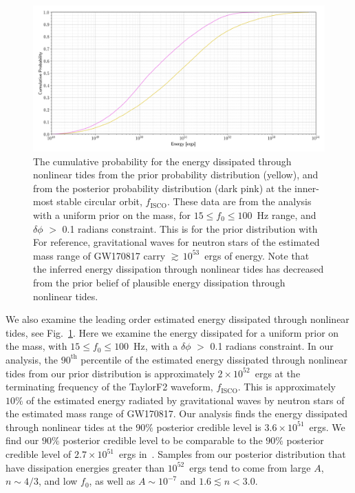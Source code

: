 \begin{figure}[th]
\includegraphics[width=\columnwidth]{figs/chapter6/uniform_narrow_f0_energy_cumulative_posterior_probability}
\caption{The cumulative probability for the energy dissipated through nonlinear tides from the prior probability distribution (yellow), and from the posterior probability distribution (dark pink) at the inner-most stable circular orbit, $f_\mathrm{ISCO}$. These data are from the analysis with a uniform prior on the mass, for $15 \leq f_0 \leq 100$~Hz range, and $\delta \phi$ $>$ 0.1 radians constraint. This is for the prior distribution with For reference, gravitational waves for neutron stars of the estimated mass range of GW170817 carry $\gtrsim \, 10^{53}$~ergs of energy. Note that the inferred energy dissipation through nonlinear tides has decreased from the prior belief of plausible energy dissipation through nonlinear tides.
}
\label{fig:uniform_f0_small_NL_energy}
\end{figure}

We also examine the leading order estimated energy dissipated through nonlinear tides, see Fig.~\ref{fig:uniform_f0_small_NL_energy}. Here we examine the energy dissipated for a uniform prior on the mass, with $15 \leq f_0 \leq 100$~Hz, with a $\delta \phi$ $>$ 0.1 radians constraint. In our analysis, the $90^{\mathrm{th}}$ percentile of the estimated energy dissipated through nonlinear tides from our prior distribution is approximately $2 \times 10^{52}$~ergs at the terminating frequency of the TaylorF2 waveform, $f_\mathrm{ISCO}$. This is approximately $10 \%$ of the estimated energy radiated by gravitational waves by neutron stars of the estimated mass range of GW170817. Our analysis finds the energy dissipated through nonlinear tides at the $90\%$ posterior credible level is $3.6 \times 10^{51}$~ergs. We find our $90\%$ posterior credible level to be comparable to the $90\%$ posterior credible level of $2.7 \times 10^{51}$~ergs in~\cite{abbott2019constraining}. Samples from our posterior distribution that have dissipation energies greater than $10^{52}$~ergs tend to come from large $A$, $n \sim 4/3$, and low $f_0$, as well as $A \sim 10^{-7}$ and $1.6 \lesssim n < 3.0$.

